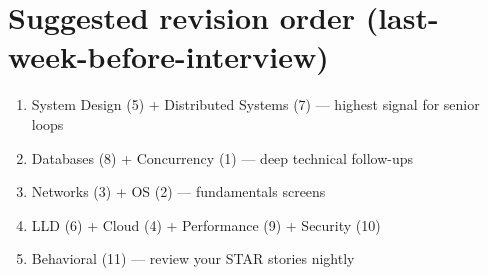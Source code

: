 \documentclass[11pt]{article}
\providecommand{\tightlist}{\setlength{\itemsep}{1pt}\setlength{\parskip}{0pt}}
\begin{document}
\section{Suggested revision order (last-week-before-interview)}\label{suggested-revision-order-last-week-before-interview}

\begin{enumerate}
\def\labelenumi{\arabic{enumi}.}
\tightlist
\item
  System Design (5) + Distributed Systems (7) --- highest signal for senior loops
\item
  Databases (8) + Concurrency (1) --- deep technical follow-ups
\item
  Networks (3) + OS (2) --- fundamentals screens
\item
  LLD (6) + Cloud (4) + Performance (9) + Security (10)
\item
  Behavioral (11) --- review your STAR stories nightly
\end{enumerate}
\end{document}
